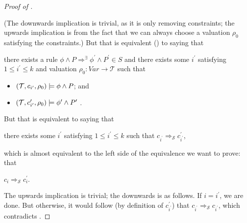\begin{proof}[Proof of ]
\begin{proofenv}
\end{proofenv}
(The downwards implication is trivial, as it is only removing constraints; the upwards implication
is from the fact that we can always choose a valuation $\rho_0$ satisfying the constraints.)
But that is equivalent () to saying that 
\begin{proofenv}
there exists a rule $\phi \land P \Rightarrow^\exists \phi^\prime \land P^\prime \in S$
and there exists some $i^\prime$ satisfying $1 \leq i^\prime \leq k$
and valuation $\rho_0 : \mathit{Var} \to \mathcal{T}$ such that
\begin{itemize}
    \item $(\mathcal{T}, c_{i^\prime}, \rho_0) \models \phi \land P$; and
    \item $(\mathcal{T}, c^\prime_{i^\prime}, \rho_0) \models \phi^\prime \land P^\prime$
    .
\end{itemize}
\end{proofenv}
But that is
equivalent to saying that
\begin{proofenv}
there exists some $i^\prime$ satisfying $1 \leq i^\prime \leq k$
such that $c_{i^\prime} \Rightarrow_{\mathcal{S}} c^\prime_{i^\prime}$,
\end{proofenv}
which is almost equivalent to the left side of the equivalence we want to prove:
that
\begin{proofenv}
$c_{i} \Rightarrow_{\mathcal{S}} c^\prime_{i}$.
\end{proofenv}
The upwards implication is trivial; the downwards is as follows. If $i = i^\prime$, we are done.
But otherwise, it would follow (by definition of $c^\prime_{i^\prime}$) that $c_{i^\prime} \Rightarrow_{\mathcal{S}} c_{i^\prime}$,
which contradicts .
\end{proof}

